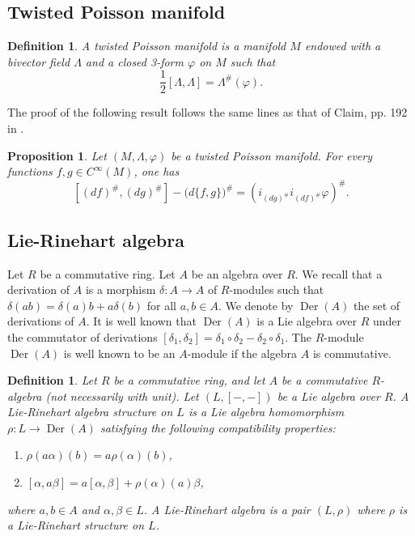 \documentclass[a4paper,10pt]{article}
\numberwithin{equation}{section}
\theoremstyle{plain}
\newtheorem{proposition}[theorem]{Proposition}
\newtheorem{definition}[theorem]{Definition}
\begin{document}
\subsection{Twisted Poisson manifold}	
\begin{definition}\label{expi2}\cite[pages 2-3]{R2}
	A twisted Poisson manifold is a manifold $M$ endowed with a bivector field $\Lambda$ and a closed 3-form $\varphi$ on $M$ such that
	\begin{equation*}
		\frac{1}{2}[\Lambda,\Lambda] =\Lambda^{\#} (\varphi).
	\end{equation*}
\end{definition}
The proof of the following result follows the same lines as that of Claim, pp. 192 in \cite{R20}.
\begin{proposition}\label{prop1}
	Let $(M,\Lambda,\varphi)$ be a twisted Poisson manifold. For every functions $f,g \in C^\infty(M)$, one has
	\begin{equation*}
		\left[(df)^{\#},(dg)^{\#}\right]-\big(d\{f,g\}\big)^{\#} = (i_{(dg)^{\#}}i_{(df)^{\#}}\varphi)^{\#}.
	\end{equation*}
\end{proposition}

	\subsection{Lie-Rinehart algebra}
Let $R$ be a commutative ring. Let $A$ be an algebra over $R$. We recall that a derivation of $A$ is a morphism $\delta: A\longrightarrow A$ of $R$-modules such that $\delta(ab)=\delta(a)b+a\delta(b)$ for all $a,b\in A$. We denote by $\operatorname{Der}(A)$ the set of derivations of $A$. It is well known that $\operatorname{Der}(A)$ is a Lie algebra over $R$ under the commutator of derivations $[\delta_1,\delta_2]=\delta_1\circ \delta_2-\delta_2\circ \delta_1$. The $R$-module $\operatorname{Der}(A)$ is well known to be an $A$-module if the algebra $A$ is commutative.

\begin{definition}\cite[page 5]{R7}
	Let $R$ be a commutative ring, and let $A$ be a commutative $R$-algebra (not necessarily with unit). Let $(L, [-,-])$ be a Lie algebra over $R$. A Lie-Rinehart algebra structure on $L$ is a Lie algebra homomorphism $\rho: L \longrightarrow \operatorname{Der}(A)$ satisfying the following compatibility properties:
	\begin{enumerate}
		\item $\rho(a\alpha)(b) = a\rho(\alpha)(b)$,
		\item $[\alpha, a\beta] = a[\alpha, \beta] + \rho(\alpha)(a)\beta$,
	\end{enumerate}
	where $a, b \in A$ and $\alpha, \beta \in L$. A Lie-Rinehart algebra is a pair $(L, \rho)$ where $\rho$ is a Lie-Rinehart structure on $L$.
\end{definition}
	
\end{document}
